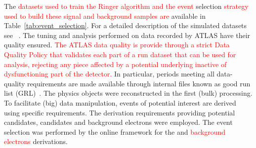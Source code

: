 The \textcolor{red}{datasets used to train the Ringer algorithm and the event} selection \textcolor{red}{strategy used to build these signal and background samples are} available in
Table~\ref{tab:event_selection}. For a detailed description of the simulated
datasets see ~\cite[Section 3]{ATLAS-PERF-2017-01-002}. The tuning and analysis
performed on data recorded by ATLAS have their quality ensured. \textcolor{red}{The ATLAS data quality is provide through a strict Data Quality Policy that validates each part of a run dataset that can be used for analysis, rejecting any piece affected by a potential underlying inactive of dysfunctioning part of the detector.} 
In particular, periods meeting all data-quality requirements
are made available through internal files known as good run list
(GRL)~\cite{grl_site}. The physics objects were reconstructed in the first
(bulk) processing. To facilitate (big) data manipulation, events of potential
interest are derived using specific requirements. The derivation requirements
providing potential \Zee{} \tnp{} candidates, %
\Jee{} \tnp{} candidates
 and background electrons %
  were employed. The event selection was
performed by the online framework for the \textcolor{red}{\Zee{} \tnp{}} and \textcolor{red}{background electrons} derivations.%




